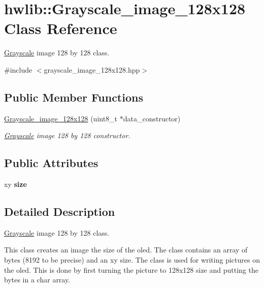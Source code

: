 \hypertarget{classhwlib_1_1Grayscale__image__128x128}{}\section{hwlib\+:\+:Grayscale\+\_\+image\+\_\+128x128 Class Reference}
\label{classhwlib_1_1Grayscale__image__128x128}


\hyperlink{classhwlib_1_1Grayscale}{Grayscale} image 128 by 128 class.  




{\ttfamily \#include $<$grayscale\+\_\+image\+\_\+128x128.\+hpp$>$}

\subsection*{Public Member Functions}
\begin{DoxyCompactItemize}
\item 
\hyperlink{classhwlib_1_1Grayscale__image__128x128_ad51141cb4b7afb259709d7173c7a11b4}{Grayscale\+\_\+image\+\_\+128x128} (uint8\+\_\+t $\ast$data\+\_\+constructor)
\begin{DoxyCompactList}\small\item\em \hyperlink{classhwlib_1_1Grayscale}{Grayscale} image 128 by 128 constructor. \end{DoxyCompactList}\end{DoxyCompactItemize}
\subsection*{Public Attributes}
\begin{DoxyCompactItemize}
\item 
\mbox{\label{classhwlib_1_1Grayscale__image__128x128_ad1aeda413fff22160eb0a8f75e3380e8}} 
xy {\bfseries size}
\end{DoxyCompactItemize}


\subsection{Detailed Description}
\hyperlink{classhwlib_1_1Grayscale}{Grayscale} image 128 by 128 class. 

This class creates an image the size of the oled. The class contains an array of bytes (8192 to be precise) and an xy size. The class is used for writing pictures on the oled. This is done by first turning the picture to 128x128 size and putting the bytes in a char array. 

